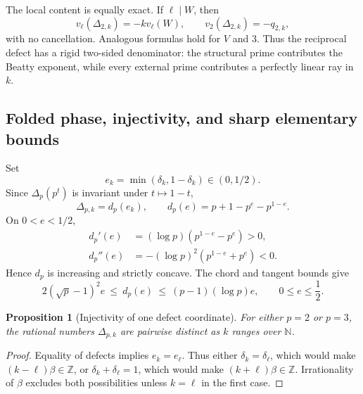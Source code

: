 \documentclass[11pt]{article}
\newtheorem{proposition}[theorem]{Proposition}
\theoremstyle{definition}
\theoremstyle{remark}
\newcommand{\Z}{\mathbb{Z}}
\newcommand{\N}{\mathbb{N}}
\begin{document}
The local content is equally exact.  If $\ell\mid W$, then
\begin{equation}\label{eq:local-W}
 v_\ell(\Delta_{2,k})=-k v_\ell(W),
 \qquad
 v_2(\Delta_{2,k})=-q_{2,k},
\end{equation}
with no cancellation.  Analogous formulas hold for $V$ and $3$.  Thus the reciprocal defect has a rigid two-sided denominator: the structural prime contributes the Beatty exponent, while every external prime contributes a perfectly linear ray in $k$.

\subsection{Folded phase, injectivity, and sharp elementary bounds}

Set
\begin{equation}\label{eq:folded}
 e_k=\min(\delta_k,1-\delta_k)\in(0,1/2).
\end{equation}
Since $\Delta_p(p^t)$ is invariant under $t\mapsto1-t$,
\begin{equation}\label{eq:delta-folded}
 \Delta_{p,k}=d_p(e_k),
 \qquad
 d_p(e)=p+1-p^e-p^{1-e}.
\end{equation}
On $0<e<1/2$,
\begin{align}
 d_p'(e)&=(\log p)(p^{1-e}-p^e)>0,\label{eq:dpprime}\\
 d_p''(e)&=-(\log p)^2(p^{1-e}+p^e)<0.\label{eq:dpsecond}
\end{align}
Hence $d_p$ is increasing and strictly concave.  The chord and tangent bounds give
\begin{equation}\label{eq:defect-fold-bounds}
 2(\sqrt p-1)^2e
 \ \le\ d_p(e)\ \le\
 (p-1)(\log p)e,
 \qquad 0\le e\le\frac12.
\end{equation}

\begin{proposition}[Injectivity of one defect coordinate]\label{prop:injectivity}
For either $p=2$ or $p=3$, the rational numbers $\Delta_{p,k}$ are pairwise distinct as $k$ ranges over $\N$.
\end{proposition}

\begin{proof}
Equality of defects implies $e_k=e_\ell$.  Thus either $\delta_k=\delta_\ell$, which would make $(k-\ell)\beta\in\Z$, or $\delta_k+\delta_\ell=1$, which would make $(k+\ell)\beta\in\Z$.  Irrationality of $\beta$ excludes both possibilities unless $k=\ell$ in the first case.
\end{proof}
\end{document}

